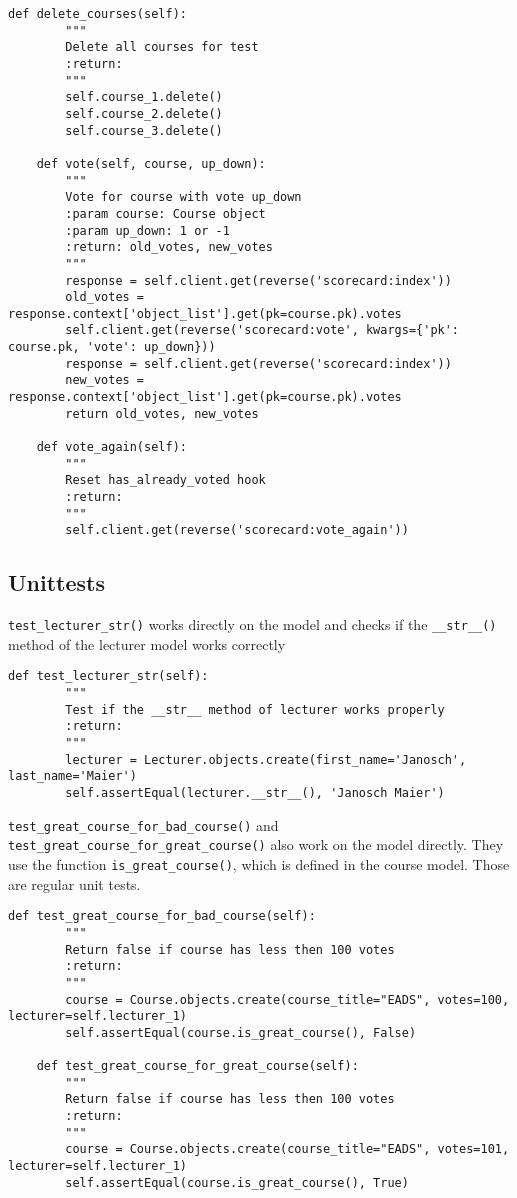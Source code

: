 \begin{lstlisting}[style=Python, caption=Exceprt from scorecard/tests.py, label=lst:tests.py]
    def delete_courses(self):
        """
        Delete all courses for test
        :return:
        """
        self.course_1.delete()
        self.course_2.delete()
        self.course_3.delete()

    def vote(self, course, up_down):
        """
        Vote for course with vote up_down
        :param course: Course object
        :param up_down: 1 or -1
        :return: old_votes, new_votes
        """
        response = self.client.get(reverse('scorecard:index'))
        old_votes = response.context['object_list'].get(pk=course.pk).votes
        self.client.get(reverse('scorecard:vote', kwargs={'pk': course.pk, 'vote': up_down}))
        response = self.client.get(reverse('scorecard:index'))
        new_votes = response.context['object_list'].get(pk=course.pk).votes
        return old_votes, new_votes

    def vote_again(self):
        """
        Reset has_already_voted hook
        :return:
        """
        self.client.get(reverse('scorecard:vote_again'))
\end{lstlisting}

\subsection{Unittests}
\lstinline|test_lecturer_str()| works directly on the model and checks if the \lstinline|__str__()| method of the lecturer model works correctly

\begin{lstlisting}[style=Python, caption=Exceprt from scorecard/tests.py, label=lst:tests.py]
    def test_lecturer_str(self):
        """
        Test if the __str__ method of lecturer works properly
        :return:
        """
        lecturer = Lecturer.objects.create(first_name='Janosch', last_name='Maier')
        self.assertEqual(lecturer.__str__(), 'Janosch Maier')
\end{lstlisting}


\lstinline|test_great_course_for_bad_course()| and \lstinline|test_great_course_for_great_course()| also work on the model directly. They use the function \lstinline|is_great_course()|, which is defined in the course model. Those are regular unit tests.

\begin{lstlisting}[style=Python, caption=Exceprt from scorecard/tests.py, label=lst:tests.py]
    def test_great_course_for_bad_course(self):
        """
        Return false if course has less then 100 votes
        :return:
        """
        course = Course.objects.create(course_title="EADS", votes=100, lecturer=self.lecturer_1)
        self.assertEqual(course.is_great_course(), False)

    def test_great_course_for_great_course(self):
        """
        Return false if course has less then 100 votes
        :return:
        """
        course = Course.objects.create(course_title="EADS", votes=101, lecturer=self.lecturer_1)
        self.assertEqual(course.is_great_course(), True)
\end{lstlisting}

